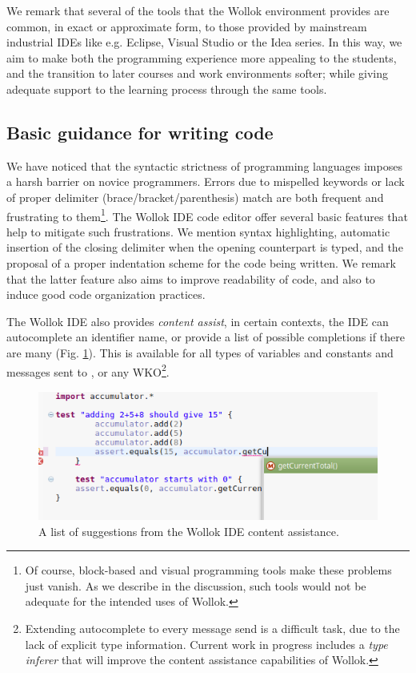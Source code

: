 We remark that several of the tools that the Wollok environment provides are common, in exact or approximate form, to those provided by mainstream industrial IDEs like e.g. Eclipse, Visual Studio or the Idea series. In this way, we aim to make both the programming experience more appealing to the students, and the transition to later courses and work environments softer; while giving adequate support to the learning process through the same tools.



\subsection{Basic guidance for writing code}
We have noticed that the syntactic strictness of programming languages imposes a harsh barrier on novice programmers. 
Errors due to mispelled keywords or lack of proper delimiter (brace/bracket/parenthesis) match are both frequent and frustrating to them\footnote{Of course, block-based and visual programming tools make these problems just vanish. As we describe in the discussion, such tools would not be adequate for the intended uses of Wollok.}.
The Wollok IDE code editor offer several basic features that help to mitigate such frustrations. We mention syntax highlighting, automatic insertion of the closing delimiter when the opening counterpart is typed, and the proposal of a proper indentation scheme for the code being written. We remark that the latter feature also aims to improve readability of code, and also to induce good code organization practices.

The Wollok IDE also provides \emph{content assist}, 
\ie in certain contexts, the IDE can autocomplete an identifier name, or provide a list of possible completions if there are many (\cf Fig. \ref{fig:codeCompletion}).
This is available for all types of variables and constants and messages sent to ,  or any WKO\footnote{Extending autocomplete to every message send is a difficult task, due to the lack of explicit type information. 
Current work in progress includes a \emph{type inferer} that will improve the content assistance capabilities of Wollok.}. 
 
\begin{figure}[ht]
 \centering
 \includegraphics[scale=0.45]{images/codeCompletion.png}
 \caption{\small A list of suggestions from the Wollok IDE content assistance.}
 \label{fig:codeCompletion}
\end{figure}

